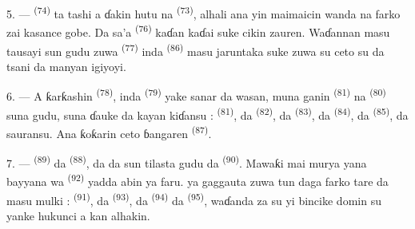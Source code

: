 \VUsaut{5.0mm}
\VUsaut{3.4mm}

5. ---  \textsuperscript{(74)} ta tashi a ɗakin hutu na
 \textsuperscript{(73)}, alhali ana yin
maimaicin  wanda  na farko zai
kasance gobe. Da sa’a  \textsuperscript{(76)} kaɗan
kaɗai suke cikin zauren. Waɗannan masu tausayi sun gudu zuwa
 \textsuperscript{(77)} inda 
\textsuperscript{(86)} masu jaruntaka suke zuwa su ceto su da tsani da
manyan igiyoyi.

6. --- A ƙarƙashin  \textsuperscript{(78)}, inda
 \textsuperscript{(79)} yake sanar da wasan, muna ganin
 \textsuperscript{(81)} na 
\textsuperscript{(80)} suna gudu, suna ɗauke da kayan kiɗansu :
 \textsuperscript{(81)}, da 
\textsuperscript{(82)}, da  \textsuperscript{(83)}, da
 \textsuperscript{(84)}, da 
\textsuperscript{(85)}, da sauransu. Ana ƙoƙarin ceto ɓangaren
 \textsuperscript{(87)}.

7. ---  \textsuperscript{(89)} da  \textsuperscript{(88)}, da  da  sun tilasta gudu da 
\textsuperscript{(90)}. Mawaƙi mai murya yana bayyana wa  \textsuperscript{(92)} yadda abin ya faru.  ya gaggauta zuwa tun daga farko tare da masu mulki :
 \textsuperscript{(91)}, da 
\textsuperscript{(93)}, da 
\textsuperscript{(94)} da  \textsuperscript{(95)},
waɗanda za su yi bincike domin su yanke hukunci a kan alhakin.

\VUsaut{6.0mm}
\VUfilet{22mm}
